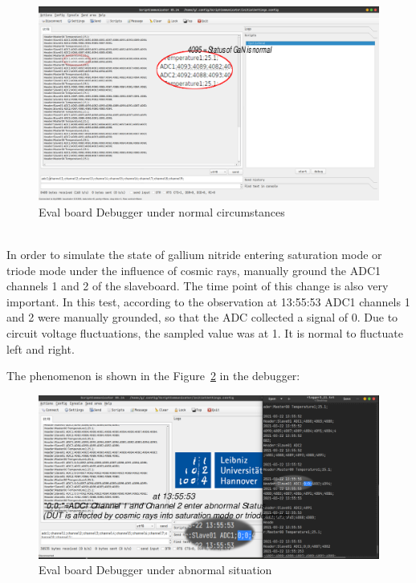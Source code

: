 \begin{figure}[!ht]
	\centering
	\includegraphics[width=16cm]{grafiken/debuggernormal.pdf}
	\caption{Eval board Debugger under normal circumstances}
	\label{fig:7.2}
\end{figure}
\FloatBarrier
\\



In order to simulate the state of gallium nitride entering saturation mode or triode mode under the influence of cosmic rays,
manually ground the ADC1 channels 1 and 2 of the slaveboard. The time point of this change is also very important. In this test, according to the observation at 13:55:53 ADC1 channels 1 and 2 were manually grounded, so that the ADC collected a signal of 0. Due to circuit voltage fluctuations, the sampled value was at 1. It is normal to fluctuate left and right.

The phenomenon is shown in the Figure~\ref{fig:7.3} in the debugger:
\begin{figure}[!ht]
	\centering
	\includegraphics[width=16cm]{grafiken/brack.pdf}
	\caption{Eval board Debugger under abnormal situation}
	\label{fig:7.3}
\end{figure}
\FloatBarrier

